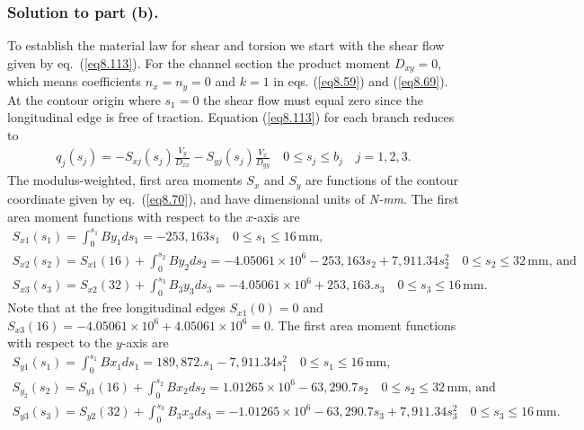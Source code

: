 \documentclass{AeroStructure-ERJohnson}
\begin{document}
\begin{example*}
\subsubsection{Solution to part (b).} To establish the material law for shear and torsion we start with
the shear flow given by eq.~(\ref{eq8.113}). For the channel
section the product moment $D_{x y}=0$, which means coefficients
$n_{x}=n_{y}=0$ and $k=1$ in eqs. (\ref{eq8.59}) and
(\ref{eq8.69}). At the contour origin where $s_{1}=0$ the shear
flow must equal zero since the longitudinal edge is free of
traction. Equation (\ref{eq8.113}) for each branch reduces to
\begin{align}
q_{j}\!\left(s_{j}\right)=-S_{x j}\!\left(s_{j}\right)
\frac{V_{y}}{D_{x x}}-S_{y j}\!\left(s_{j}\right) \frac{V_{x}}{D_{y
y}} \quad 0 \leq s_{j} \leq b_{j} \quad j=1,2,3.\tag{g}\label{ex8.5g}
\end{align}
The
modulus-weighted, first area moments $S_{x}$ and $S_{y}$ are
functions of the contour coordinate given by eq.~(\ref{eq8.70}),
and have dimensional units of \textit{N-mm}. The first area moment
functions with respect to the $x$-axis are
\begin{gather}
S_{x 1}\!\left(s_{1}\right)=\int_{0}^{s_{1}} B y_{1} d
s_{1}=-253{,}163 s_{1} \quad 0 \leq s_{1} \leq 16\,\mathrm{mm},\tag{h}\label{ex8.5h}\\
S_{x 2}\left(s_{2}\right)=S_{x 1}(16)+\int_{0}^{s_{2}} B
y_{2} d s_{2}=-4.05061 \times 10^{6}-253{,}163 s_{2}+7{,}911.34
s_{2}^{2} \quad 0 \leq s_{2} \leq 32\,\mathrm{mm}\mbox{, and}\tag{i}\label{ex8.5i}\\
S_{x 3}\left(s_{3}\right)=S_{x 2}(32)+\int_{0}^{s_{3}} B_{3}
y_{3} d s_{3}=-4.05061 \times 10^{6}+253{,}163. s_{3} \quad 0 \leq
s_{3} \leq 16\,\mathrm{mm}.\tag{j}\label{ex8.5j}
\end{gather}
Note that at the free
longitudinal edges $S_{x 1}(0)=0$ and $S_{x 3}(16)=-4.05061 \times
10^{6}+4.05061 \times 10^{6}=0$. The first area moment functions
with respect to the $y$-axis are
\begin{gather}
S_{y 1}\left(s_{1}\right)=\int_{0}^{s_{1}}\! B x_{1} d
s_{1}=189,872. s_{1}-7,911.34 s_{1}^{2} \quad 0 \leq s_{1} \leq
16\,\mathrm{mm},\tag{k}\label{ex8.5k}\\
S_{y_{2}}\left(s_{2}\right)=S_{y
1}(16)+\int_{0}^{s_{2}}\! B x_{2} d s_{2}=1.01265 \times
10^{6}-63,290.7 s_{2} \quad 0 \leq s_{2} \leq 32\,\mathrm{mm}\mbox{, and }\tag{l}\label{ex8.5l}\\
S_{y 3}\left(s_{3}\right)=S_{y
2}(32)+\int_{0}^{s_{3}}\! B_{3} x_{3} d s_{3}=-1.01265 \times
10^{6}-63,290.7 s_{3}+7,911.34 s_{3}^{2} \quad 0 \leq s_{3} \leq
16\,\mathrm{mm}.\tag{m}\label{ex8.5m}
\end{gather}
\vspace*{3pt}
\clearpage


\end{example*}
\end{document}
